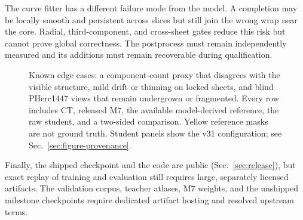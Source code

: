 The curve fitter has a different failure mode from the model.
A completion may be locally smooth and persistent across slices but still join
the wrong wrap near the core.
Radial, third-component, and cross-sheet gates reduce this risk but cannot prove
global correctness.
The postprocess must remain independently measured and its additions must remain
recoverable during qualification.

\begin{figure}[t]
  \centering
  \caption{Known edge cases: a component-count proxy that disagrees with the
  visible structure, mild drift or thinning on locked sheets, and blind
  PHerc1447 views that remain undergrown or fragmented.
  Every row includes CT, released M7, the available model-derived reference,
  the raw student, and a two-sided comparison. Yellow reference masks are not
  ground truth. Student panels show the v31 configuration; see
  Sec.~\ref{sec:figure-provenance}.}
  \label{fig:limitations}
\end{figure}

Finally, the shipped checkpoint and the code are public
(Sec.~\ref{sec:release}), but exact replay of training and evaluation still
requires large, separately licensed artifacts.
The validation corpus, teacher atlases, M7 weights, and the unshipped milestone
checkpoints require dedicated artifact hosting and resolved upstream terms.
